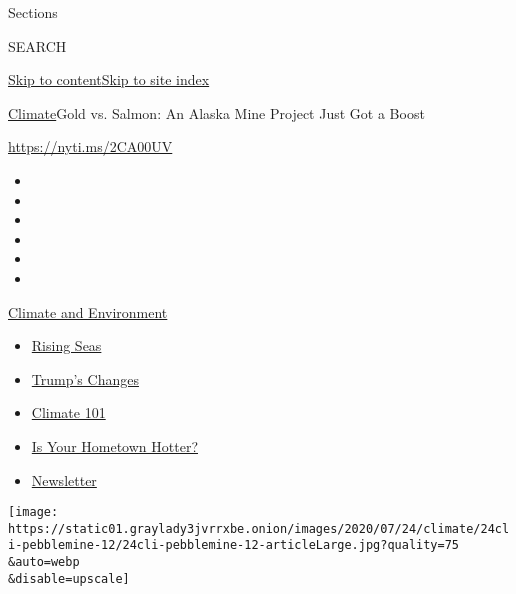 Sections

SEARCH

\protect\hyperlink{site-content}{Skip to
content}\protect\hyperlink{site-index}{Skip to site index}

\href{/section/climate}{Climate}\textbar{}Gold vs. Salmon: An Alaska
Mine Project Just Got a Boost

\url{https://nyti.ms/2CA00UV}

\begin{itemize}
\item
\item
\item
\item
\item
\item
\end{itemize}

\href{https://www.nytimes3xbfgragh.onion/section/climate?action=click\&pgtype=Article\&state=default\&region=TOP_BANNER\&context=storylines_menu}{Climate
and Environment}

\begin{itemize}
\tightlist
\item
  \href{https://www.nytimes3xbfgragh.onion/2020/07/30/climate/sea-level-inland-floods.html?action=click\&pgtype=Article\&state=default\&region=TOP_BANNER\&context=storylines_menu}{Rising
  Seas}
\item
  \href{https://www.nytimes3xbfgragh.onion/interactive/2020/climate/trump-environment-rollbacks.html?action=click\&pgtype=Article\&state=default\&region=TOP_BANNER\&context=storylines_menu}{Trump's
  Changes}
\item
  \href{https://www.nytimes3xbfgragh.onion/interactive/2020/04/19/climate/climate-crash-course-1.html?action=click\&pgtype=Article\&state=default\&region=TOP_BANNER\&context=storylines_menu}{Climate
  101}
\item
  \href{https://www.nytimes3xbfgragh.onion/interactive/2018/08/30/climate/how-much-hotter-is-your-hometown.html?action=click\&pgtype=Article\&state=default\&region=TOP_BANNER\&context=storylines_menu}{Is
  Your Hometown Hotter?}
\item
  \href{https://www.nytimes3xbfgragh.onion/newsletters/climate-change?action=click\&pgtype=Article\&state=default\&region=TOP_BANNER\&context=storylines_menu}{Newsletter}
\end{itemize}

\texttt{[image: https://static01.graylady3jvrrxbe.onion/images/2020/07/24/climate/24cli-pebblemine-12/24cli-pebblemine-12-articleLarge.jpg?quality=75\\\&auto=webp\\\&disable=upscale]}

